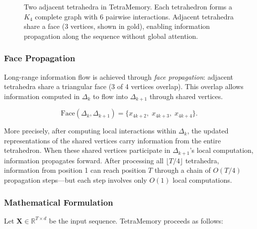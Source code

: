 \begin{figure}[H]
\caption{Two adjacent tetrahedra in TetraMemory. Each tetrahedron forms a $K_4$ complete graph with 6 pairwise interactions. Adjacent tetrahedra share a face (3 vertices, shown in gold), enabling information propagation along the sequence without global attention.}
\label{fig:tetramemory-k4}
\end{figure}

\subsubsection{Face Propagation}

Long-range information flow is achieved through \emph{face propagation}: adjacent tetrahedra share a triangular face (3 of 4 vertices overlap). This overlap allows information computed in $\Delta_k$ to flow into $\Delta_{k+1}$ through shared vertices.

\begin{equation}
\text{Face}(\Delta_k, \Delta_{k+1}) = \{x_{4k+2},\; x_{4k+3},\; x_{4k+4}\}.
\label{eq:face-sharing}
\end{equation}

More precisely, after computing local interactions within $\Delta_k$, the updated representations of the shared vertices carry information from the entire tetrahedron. When these shared vertices participate in $\Delta_{k+1}$'s local computation, information propagates forward. After processing all $\lfloor T/4 \rfloor$ tetrahedra, information from position 1 can reach position $T$ through a chain of $O(T/4)$ propagation steps---but each step involves only $O(1)$ local computations.

\subsubsection{Mathematical Formulation}

Let $\mathbf{X} \in \mathbb{R}^{T \times d}$ be the input sequence. TetraMemory proceeds as follows:


